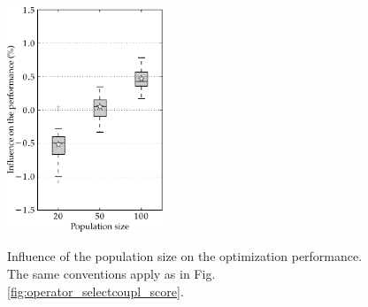 \documentclass{ametsoc}
\begin{document}
\begin{figure}[t]
	\begin{center}
		\noindent\includegraphics[width=11pc,angle=0]{fig13.pdf}\\
	\end{center}
	\caption{Influence of the population size on the optimization performance. The same conventions apply as in Fig. \ref{fig:operator_selectcoupl_score}.}
	\label{fig:option_taillepop_score}
\end{figure}
\end{document}
